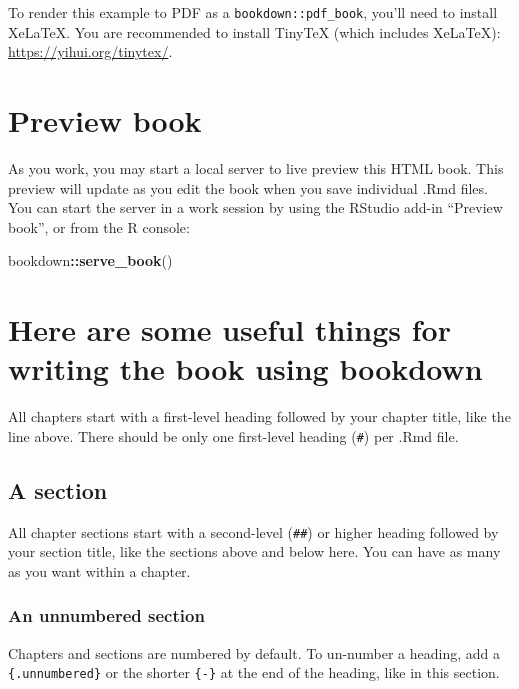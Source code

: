 \documentclass[
]{book}
\newenvironment{Shaded}{\begin{snugshade}}{\end{snugshade}}
\newcommand{\FunctionTok}[1]{\textcolor[rgb]{0.13,0.29,0.53}{\textbf{#1}}}
\newcommand{\NormalTok}[1]{#1}
\newcommand{\SpecialCharTok}[1]{\textcolor[rgb]{0.81,0.36,0.00}{\textbf{#1}}}
\theoremstyle{definition}
\theoremstyle{definition}
\theoremstyle{definition}
\theoremstyle{definition}
\theoremstyle{remark}
\begin{document}
To render this example to PDF as a \texttt{bookdown::pdf\_book}, you'll need to install XeLaTeX. You are recommended to install TinyTeX (which includes XeLaTeX): \url{https://yihui.org/tinytex/}.

\section{Preview book}\label{preview-book}

As you work, you may start a local server to live preview this HTML book. This preview will update as you edit the book when you save individual .Rmd files. You can start the server in a work session by using the RStudio add-in ``Preview book'', or from the R console:

\begin{Shaded}
\begin{Highlighting}[]
\NormalTok{bookdown}\SpecialCharTok{::}\FunctionTok{serve\_book}\NormalTok{()}
\end{Highlighting}
\end{Shaded}

\section{Here are some useful things for writing the book using bookdown}\label{here-are-some-useful-things-for-writing-the-book-using-bookdown}

All chapters start with a first-level heading followed by your chapter title, like the line above. There should be only one first-level heading (\texttt{\#}) per .Rmd file.

\subsection{A section}\label{a-section}

All chapter sections start with a second-level (\texttt{\#\#}) or higher heading followed by your section title, like the sections above and below here. You can have as many as you want within a chapter.

\subsubsection*{An unnumbered section}\label{an-unnumbered-section}

Chapters and sections are numbered by default. To un-number a heading, add a \texttt{\{.unnumbered\}} or the shorter \texttt{\{-\}} at the end of the heading, like in this section.
\end{document}
